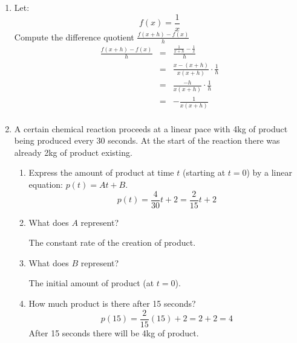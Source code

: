 \documentclass[letterpaper,12pt,fleqn]{article}
\begin{document}
\begin{enumerate}
\bigskip

\item Let:
\[f(x)=\frac{1}{x}\]
Compute the difference quotient $\frac{f(x+h)-f(x)}{h}$
\begin{eqnarray*}
\frac{f(x+h)-f(x)}{h} &=& \frac{\frac{1}{x+h}-\frac{1}{x}}{h} \\
    &=& \frac{x-(x+h)}{x(x+h)}\cdot\frac{1}{h} \\
    &=& \frac{-h}{x(x+h)}\cdot\frac{1}{h} \\
    &=& -\frac{1}{x(x+h)} \\
\end{eqnarray*}

\item A certain chemical reaction proceeds at a linear pace with 4kg of product
being produced every 30 seconds. At the start of the reaction there was already
2kg of product existing.
\begin{enumerate}
\item Express the amount of product at time $t$ (starting at $t=0$) by a linear
equation: $p(t)=At+B$.
\[p(t)=\frac{4}{30}t+2=\frac{2}{15}t+2\]

\item What does $A$ represent?

\bigskip

The constant rate of the creation of product.

\bigskip

\item What does $B$ represent?

\bigskip

The initial amount of product (at $t=0$).

\bigskip

\item How much product is there after 15 seconds?
\[p(15)=\frac{2}{15}(15)+2=2+2=4\]
After 15 seconds there will be 4kg of product.
\end{enumerate}

\end{enumerate}
\end{document}
